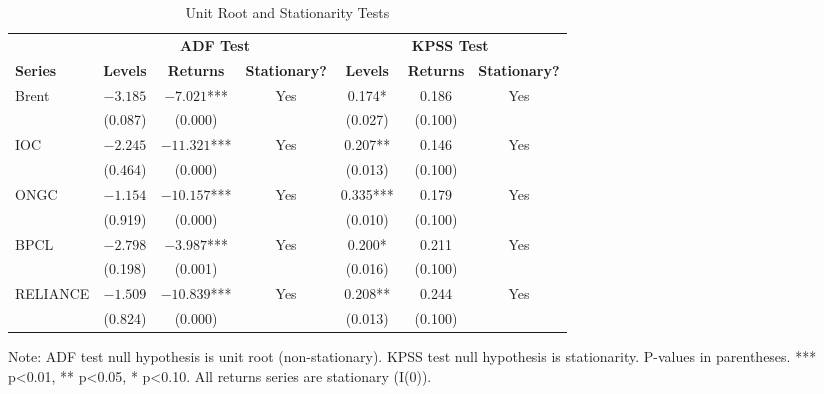 \documentclass[11pt]{article}
\begin{document}
\begin{table}[htbp]
\centering
\caption{Unit Root and Stationarity Tests}
\label{tab:stationarity}
\begin{tabular}{lcccccc}
\toprule
 & \multicolumn{3}{c}{\textbf{ADF Test}} & \multicolumn{3}{c}{\textbf{KPSS Test}} \\
\cmidrule(lr){2-4} \cmidrule(lr){5-7}
\textbf{Series} & \textbf{Levels} & \textbf{Returns} & \textbf{Stationary?} & \textbf{Levels} & \textbf{Returns} & \textbf{Stationary?} \\
\midrule
Brent  & $-3.185$      & $-7.021$*** & Yes & 0.174*  & 0.186  & Yes \\
       & (0.087)       & (0.000)     &     & (0.027) & (0.100) &     \\
IOC    & $-2.245$      & $-11.321$*** & Yes & 0.207** & 0.146  & Yes \\
       & (0.464)       & (0.000)     &     & (0.013) & (0.100) &     \\
ONGC   & $-1.154$      & $-10.157$*** & Yes & 0.335*** & 0.179  & Yes \\
       & (0.919)       & (0.000)     &     & (0.010) & (0.100) &     \\
BPCL   & $-2.798$      & $-3.987$*** & Yes & 0.200*  & 0.211  & Yes \\
       & (0.198)       & (0.001)     &     & (0.016) & (0.100) &     \\
RELIANCE & $-1.509$    & $-10.839$*** & Yes & 0.208** & 0.244  & Yes \\
         & (0.824)     & (0.000)     &     & (0.013) & (0.100) &     \\
\bottomrule
\end{tabular}
\begin{tablenotes}
\small
\item Note: ADF test null hypothesis is unit root (non-stationary). KPSS test null hypothesis is stationarity. P-values in parentheses. *** p<0.01, ** p<0.05, * p<0.10. All returns series are stationary (I(0)).
\end{tablenotes}
\end{table}
\end{document}
